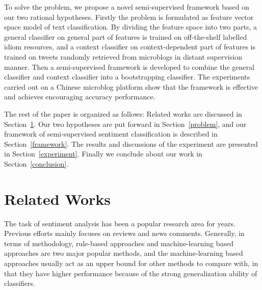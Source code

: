 \documentclass{llncs}
\begin{document}
To solve the problem, we propose a novel semi-supervised framework based on our two rational hypotheses.
Firstly the problem is formulated as feature vector space model of text classification. 
By dividing the feature space into two parts, a general classifier on general part of features is trained on off-the-shelf labelled idiom resources, and a context classifier on context-dependent part of features is trained on tweets randomly retrieved from microblogs in distant supervision manner. 
Then a semi-supervised framework is developed to combine the general classifier and context classifier into a bootstrapping classifier. 
The experiments carried out on a Chinese microblog platform show that the framework is  effective and achieves encouraging accuracy performance.

The rest of the paper is organized as follows: Related works are discussed in Section~\ref{related}. Our two hypotheses are put forward in
Section~\ref{problem}, and our framework of semi-supervised sentiment classification is described in Section~\ref{framework}. The results and discussions of the experiment are presented in Section~\ref{experiment}. Finally we conclude about our work in Section~\ref{conclusion}.
\section{Related Works}
\label{related}
The task of sentiment analysis has been a popular research area for years. 
Previous efforts mainly focuses on reviews and news comments. 
Generally, in terms of methodology, rule-based approaches and machine-learning based approaches are two major popular methods, and the machine-learning based approaches usually act as an upper bound for other methods to compare with, in that they have higher performance because of the strong generalization ability of classifiers\cite{xsongx:b1,xsongx:b4}.
\end{document}
